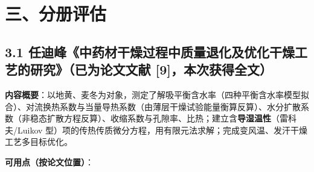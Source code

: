 \documentclass[12pt,a4paper]{ctexart}
\begin{document}
\section{三、分册评估}

\subsection{3.1 任迪峰《中药材干燥过程中质量退化及优化干燥工艺的研究》（已为论文文献 [9]，本次获得全文）}

\textbf{内容概要}：以地黄、麦冬为对象，测定了解吸平衡含水率（四种平衡含水率模型拟合）、对流换热系数与当量导热系数（由薄层干燥试验能量衡算反算）、水分扩散系数（非稳态扩散方程反算）、收缩系数与孔隙率、比热；建立含\textbf{导湿温性}（雷科夫/Luikov 型）项的传热传质微分方程，用有限元法求解；完成变风温、发汗干燥工艺多目标优化。

\textbf{可用点（按论文位置）}：
\end{document}
